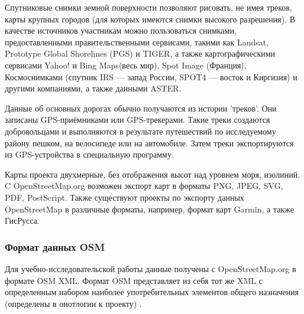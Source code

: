 \documentclass[12pt,a4paper,oneside]{article} %
\begin{document}
Спутниковые снимки земной поверхности позволяют рисовать, не имея \linebreak
треков, карты крупных городов (для которых имеются снимки \linebreak
высокого разрешения). В качестве источников участникам можно \linebreak
пользоваться снимками, предоставленными правительственными сервисами,\linebreak
такими как Landsat, Prototype Global Shorelines (PGS) и TIGER,\linebreak
а также картографическими сервисами Yahoo! и Bing Maps(весь мир), \linebreak
Spot Image (Франция), Космоснимками (спутник IRS — запад России, \linebreak
SPOT4 — восток и Киргизия) и другими компаниями, а также данными \linebreak
ASTER.

Данные об основных дорогах обычно получаются из истории 'треков'. \linebreak
Они записаны GPS-приёмниками или GPS-трекерами. Такие треки \linebreak
создаются добровольцами и выполняются в результате путешествий по \linebreak
исследуемому району пешком, на велосипеде или на автомобиле. Затем \linebreak
треки экспортируются из GPS-устройства в специальную программу.

Карты проекта двухмерные, без отображения высот над уровнем моря, \linebreak
изолиний. C OpenStreetMap.org возможен экспорт карт в форматы PNG, \linebreak
JPEG, SVG, PDF, PostScript. Также существуют проекты по экспорту \linebreak
данных OpenStreetMap в различные форматы, например, формат карт \linebreak
Garmin, а также ГисРусса.

\subsubsection{Формат данных OSM}

Для учебно-исследовательской работы данные получены с \linebreak
OpenStreetMap.org в формате OSM XML. Формат OSM представляет \linebreak
из себя тот же XML с определенным набором наиболее \linebreak
употребительных элементов общего назначения (определены в \linebreak
онотлогии к проекту) .
\end{document}
